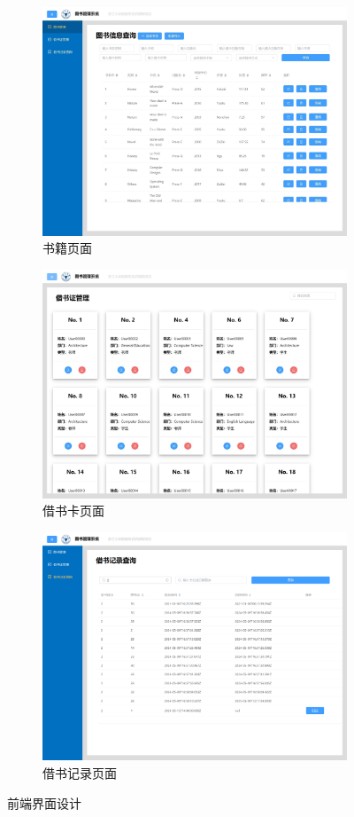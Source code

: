 \documentclass[a4paper,oneside]{ctexbook}
\begin{document}
\begin{figure}[ht]
    \centering
    \begin{subfigure}{.5\linewidth}
       \centering
       \includegraphics[width=.8\linewidth]{front-book.jpeg}
       \caption{书籍页面}
    \end{subfigure}%
    \begin{subfigure}{.5\linewidth}
       \centering
       \includegraphics[width=.8\linewidth]{front-card.jpeg}
       \caption{借书卡页面}
    \end{subfigure}
    \begin{subfigure}{.5\linewidth}
       \centering
       \includegraphics[width=.8\linewidth]{front-borrow}
       \caption{借书记录页面}
    \end{subfigure}
    \caption{前端界面设计}
    \label{fig:front-design}
\end{figure}
\end{document}
